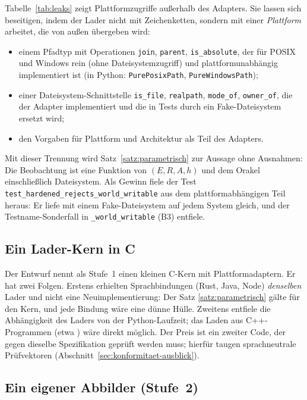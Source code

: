 Tabelle~\ref{tab:leaks} zeigt Plattformzugriffe außerhalb des Adapters. Sie lassen sich beseitigen, indem der Lader nicht mit Zeichenketten, sondern mit einer \emph{Plattform} arbeitet, die von außen übergeben wird:
\begin{itemize}
	\item einem Pfadtyp mit Operationen \texttt{join}, \texttt{parent}, \texttt{is\_absolute}, der für POSIX und Windows rein (ohne Dateisystemzugriff) und plattformunabhängig implementiert ist (in Python: \texttt{PurePosixPath}, \texttt{PureWindowsPath});
	\item einer Dateisystem-Schnittstelle \texttt{is\_file}, \texttt{realpath}, \texttt{mode\_of}, \texttt{owner\_of}, die der Adapter implementiert und die in Tests durch ein Fake-Dateisystem ersetzt wird;
	\item den Vorgaben für Plattform und Architektur als Teil des Adapters.
\end{itemize}
Mit dieser Trennung wird Satz~\ref{satz:parametrisch} zur Aussage ohne Ausnahmen: Die Beobachtung ist eine Funktion von $(E,R,A,h)$ und dem Orakel einschließlich Dateisystem. Als Gewinn fiele der Test \texttt{test\_hardened\_rejects\_world\_writable} aus dem plattformabhängigen Teil heraus: Er liefe mit einem Fake-Dateisystem auf jedem System gleich, und der Testname-Sonderfall in \texttt{\_world\_writable} (B3) entfiele.

\subsection{Ein Lader-Kern in C}

Der Entwurf nennt als Stufe~1 einen kleinen C-Kern mit Plattformadaptern. Er hat zwei Folgen. Erstens erhielten Sprachbindungen (Rust, Java, Node) \emph{denselben} Lader und nicht eine Neuimplementierung: Der Satz \ref{satz:parametrisch} gälte für den Kern, und jede Bindung wäre eine dünne Hülle. Zweitens entfiele die Abhängigkeit des Laders von der Python-Laufzeit; das Laden aus C++-Programmen (etwa ) wäre direkt möglich. Der Preis ist ein zweiter Code, der gegen dieselbe Spezifikation geprüft werden muss; hierfür taugen sprachneutrale Prüfvektoren (Abschnitt~\ref{sec:konformitaet-ausblick}).

\subsection{Ein eigener Abbilder (Stufe~2)}

